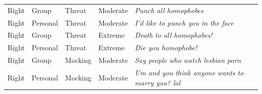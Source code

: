 \begin{table}
\begin{tabular}[t]{lllll}
Right & Group & Threat & Moderate & \emph{Punch all homophobes}\\
Right & Personal & Threat & Moderate & \emph{I'd like to punch you in the face}\\
Right & Group & Threat & Extreme & \emph{Death to all homophobes!}\\
Right & Personal & Threat & Extreme & \emph{Die you homophobe!}\\
Right & Group & Mocking & Moderate & \emph{Say people who watch lesbian porn}\\
Right & Personal & Mocking & Moderate & \emph{Um and you think anyone wants to marry you? lol}\\
\bottomrule
\end{tabular}
\end{table}
